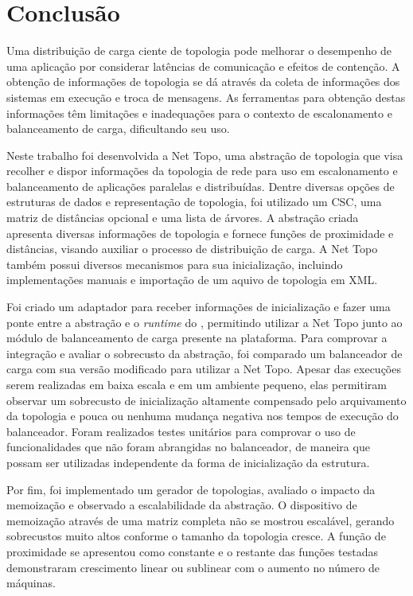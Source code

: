 \chapter{Conclusão}
\label{cap:conclusao}

Uma distribuição de carga ciente de topologia pode melhorar o desempenho de uma aplicação por considerar latências de comunicação e efeitos de contenção.
A obtenção de informações de topologia se dá através da coleta de informações dos sistemas em execução e troca de mensagens.
As ferramentas para obtenção destas informações têm limitações e inadequações para o contexto de escalonamento e balanceamento de carga, dificultando seu uso.

Neste trabalho foi desenvolvida a Net Topo, uma abstração de topologia que visa recolher e dispor informações da topologia de rede para uso em escalonamento e balanceamento de aplicações paralelas e distribuídas.
Dentre diversas opções de estruturas de dados e representação de topologia, foi utilizado um CSC, uma matriz de distâncias opcional e uma lista de árvores.
A abstração criada apresenta diversas informações de topologia e fornece funções de proximidade e distâncias, visando auxiliar o processo de distribuição de carga.
A Net Topo também possui diversos mecanismos para sua inicialização, incluindo implementações manuais e importação de um aquivo de topologia em XML.

Foi criado um adaptador para receber informações de inicialização e fazer uma ponte entre a abstração e o \textit{runtime} do \charm, permitindo utilizar a Net Topo junto ao módulo de balanceamento de carga presente na plataforma.
Para comprovar a integração e avaliar o sobrecusto da abstração, foi comparado um balanceador de carga com sua versão modificado para utilizar a Net Topo.
Apesar das execuções serem realizadas em baixa escala e em um ambiente pequeno, elas permitiram observar um sobrecusto de inicialização altamente compensado pelo arquivamento da topologia e pouca ou nenhuma mudança negativa nos tempos de execução do balanceador.
Foram realizados testes unitários para comprovar o uso de funcionalidades que não foram abrangidas no balanceador, de maneira que possam ser utilizadas independente da forma de inicialização da estrutura.

Por fim, foi implementado um gerador de topologias, avaliado o impacto da memoização e observado a escalabilidade da abstração.
O dispositivo de memoização através de uma matriz completa não se mostrou escalável, gerando sobrecustos muito altos conforme o tamanho da topologia cresce.
A função de proximidade se apresentou como constante e o restante das funções testadas demonstraram crescimento linear ou sublinear com o aumento no número de máquinas.

